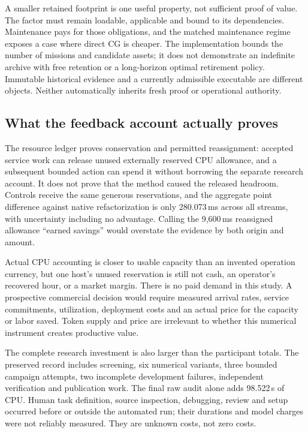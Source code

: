 A smaller retained footprint is one useful property, not sufficient proof of value. The factor must remain
loadable, applicable and bound to its dependencies. Maintenance pays for those obligations, and the matched
maintenance regime exposes a case where direct CG is cheaper. The implementation bounds the number of
missions and candidate assets; it does not demonstrate an indefinite archive with free retention or a
long-horizon optimal retirement policy. Immutable historical evidence and a currently admissible executable
are different objects. Neither automatically inherits fresh proof or operational authority.

\subsection{What the feedback account actually proves}

The resource ledger proves conservation and permitted reassignment: accepted service work can release
unused externally reserved CPU allowance, and a subsequent bounded action can spend it without borrowing
the separate research account. It does not prove that the method caused the released headroom. Controls
receive the same generous reservations, and the aggregate point difference against native refactorization
is only 280.073\,ms across all streams, with uncertainty including no advantage. Calling the 9,600\,ms
reassigned allowance ``earned savings'' would overstate the evidence by both origin and amount.

Actual CPU accounting is closer to usable capacity than an invented operation currency, but one host's
unused reservation is still not cash, an operator's recovered hour, or a market margin. There is no paid
demand in this study. A prospective commercial decision would require measured arrival rates, service
commitments, utilization, deployment costs and an actual price for the capacity or labor saved. Token supply
and price are irrelevant to whether this numerical instrument creates productive value.

The complete research investment is also larger than the participant totals. The preserved record includes
screening, six numerical variants, three bounded campaign attempts, two incomplete development failures,
independent verification and publication work. The final raw audit alone adds 98.522\,s of CPU. Human task
definition, source inspection, debugging, review and setup occurred before or outside the automated run;
their durations and model charges were not reliably measured. They are unknown costs, not zero costs.


